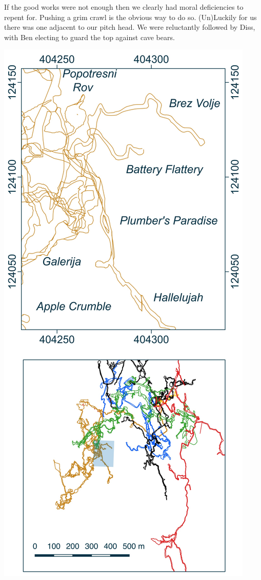 If the good works were not enough then we clearly had moral deficiencies to repent for. Pushing a grim crawl is the obvious way to do so. (Un)Luckily for us there was one adjacent to our pitch head.  We were reluctantly followed by Diss, with Ben electing to guard the top against cave bears.

\begin{marginsurvey}
\checkoddpage \ifoddpage \forcerectofloat \else \forceversofloat \fi
\centering
 \includegraphics[width=\linewidth]{images/little_insets/hallelujah_inset.pdf}

\end{marginsurvey}
